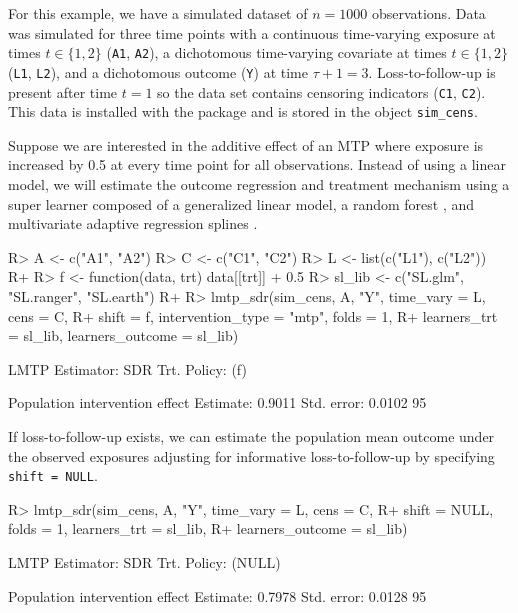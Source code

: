 \documentclass[twoside,11pt]{article}
\newenvironment{CodeChunk}{}{}
\let\code=\texttt
\begin{document}
For this example, we have a simulated dataset of \(n = 1000\) observations. Data was simulated for three time points with a continuous time-varying exposure at times \(t \in \{1, 2\}\) (\code{A1}, \code{A2}), a dichotomous time-varying covariate at times \(t \in \{1, 2\}\) (\code{L1}, \code{L2}), and a dichotomous outcome (\code{Y}) at time \(\tau + 1 = 3\). Loss-to-follow-up is present after time \(t = 1\) so the data set contains censoring indicators (\code{C1}, \code{C2}). This data is installed with the package and is stored in the object \code{sim\_cens}.

Suppose we are interested in the additive effect of an MTP where exposure is increased by 0.5 at every time point for all observations. Instead of using a linear model,  we will estimate the outcome regression and treatment mechanism using a super learner composed of a generalized linear model, a random forest \citep{wrightRanger}, and multivariate adaptive regression splines \citep{milborrowEarth}. 

\begin{CodeChunk}
\begin{CodeInput}
R> A <- c("A1", "A2")
R> C <- c("C1", "C2")
R> L <- list(c("L1"), c("L2"))
R+
R> f <- function(data, trt) data[[trt]] + 0.5
R> sl_lib <- c("SL.glm", "SL.ranger", "SL.earth")
R+
R> lmtp_sdr(sim_cens, A, "Y", time_vary = L, cens = C,
R+         shift = f, intervention_type = "mtp", folds = 1,
R+         learners_trt = sl_lib, learners_outcome = sl_lib)
\end{CodeInput}

\begin{CodeOutput}
LMTP Estimator: SDR
   Trt. Policy: (f)

Population intervention effect
      Estimate: 0.9011
    Std. error: 0.0102
        95%
\end{CodeOutput}
\end{CodeChunk}

If loss-to-follow-up exists, we can estimate the population mean outcome under the observed exposures adjusting for informative loss-to-follow-up by specifying \code{shift = NULL}. 

\begin{CodeChunk}

\begin{CodeInput}
R> lmtp_sdr(sim_cens, A, "Y", time_vary = L, cens = C,
R+          shift = NULL, folds = 1, learners_trt = sl_lib, 
R+          learners_outcome = sl_lib)
\end{CodeInput}

\begin{CodeOutput}
LMTP Estimator: SDR
   Trt. Policy: (NULL)

Population intervention effect
      Estimate: 0.7978
    Std. error: 0.0128
        95%
\end{CodeOutput}
\end{CodeChunk}
\end{document}
